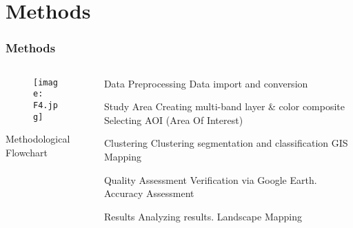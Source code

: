 \documentclass[pdflatex,compress,8pt,
	xcolor={dvipsnames,dvipsnames,svgnames,x11names,table},
	hyperref={colorlinks = true,
	breaklinks = true, 
	urlcolor = NavyBlue, 
	breaklinks = true}]{beamer}
\begin{document}
\section{Methods} 
\begin{frame}\frametitle{Methods}
\begin{minipage}[0.4\textheight]{\textwidth}
\begin{columns}[T]
\begin{column}{0.5\textwidth}
\vspace{2em}
\begin{figure}[H]
	\centering
		\texttt{[image: F4.jpg]}
\end{figure}
\footnotesize{Methodological Flowchart}
\end{column}
\begin{column}{0.5\textwidth}
\vspace{1em}  

\begin{alertblock}{Data Preprocessing}
Data import and conversion
\end{alertblock}

\begin{block}{Study Area}
Creating multi-band layer \& color composite Selecting AOI (Area Of Interest)
\end{block}

\begin{block}{Clustering}
Clustering segmentation and classification GIS Mapping
\end{block}

\begin{block}{Quality Assessment}
Verification via Google Earth. Accuracy Assessment
\end{block}

\begin{block}{Results}
Analyzing results. Landscape Mapping
\end{block}

\end{column}
\end{columns}
\end{minipage}
\end{frame}
\end{document}
